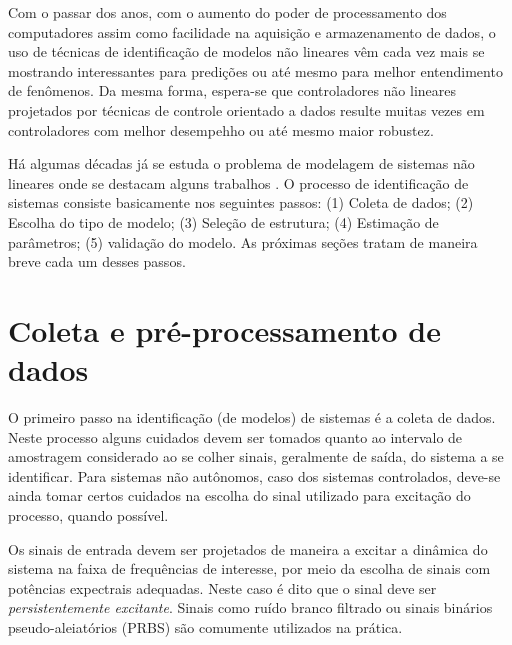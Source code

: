 Com o passar dos anos, com o aumento do poder de processamento dos computadores assim como facilidade na aquisição e armazenamento  de dados, o uso  de técnicas  de identificação de modelos não lineares vêm cada vez mais se mostrando interessantes para predições ou até mesmo para melhor entendimento de fenômenos. Da mesma forma, espera-se que controladores não lineares projetados por técnicas de controle orientado a dados resulte muitas vezes em controladores com melhor desempehho ou até mesmo maior robustez.

Há algumas décadas já se estuda o problema de modelagem de sistemas não lineares onde se destacam alguns trabalhos \citep{billings1980,leontaritis1985,leontaritis1985a,korenberg1988,billings1989,chen1990,chen1992,aguirre1995,aguirre2000,zhu2005}.
O processo de identificação de sistemas consiste basicamente nos seguintes passos: (1) Coleta de dados; (2) Escolha do tipo de modelo; (3) Seleção de estrutura; (4) Estimação de parâmetros; (5) validação do modelo. As próximas seções tratam de maneira breve cada um desses passos.

\section{Coleta e pré-processamento de dados}\label{sec:coleta}
O primeiro passo na identificação (de modelos) de sistemas é a coleta de dados. Neste processo alguns cuidados devem ser tomados quanto ao intervalo de amostragem considerado ao se colher sinais, geralmente de saída, do sistema a se identificar. Para sistemas não autônomos, caso dos sistemas controlados, deve-se ainda tomar certos cuidados na escolha do sinal utilizado para excitação do processo, quando possível. 

Os sinais de entrada devem ser projetados de maneira a excitar a dinâmica do sistema na faixa de frequências de interesse, por meio da escolha de sinais com potências expectrais adequadas. Neste caso é dito que o sinal deve ser \textit{persistentemente excitante}. Sinais como ruído branco filtrado ou sinais binários pseudo-aleiatórios (PRBS) são comumente  utilizados na prática.

